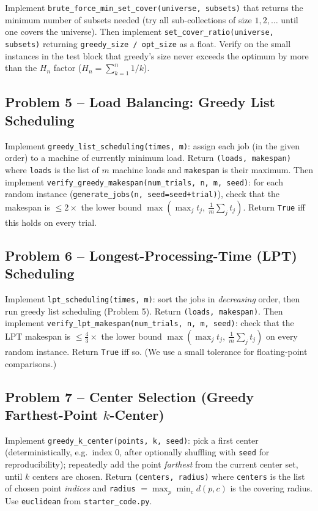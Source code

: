 \documentclass[11pt]{article}
\begin{document}
Implement \texttt{brute\_force\_min\_set\_cover(universe, subsets)} that returns the
minimum number of subsets needed (try all sub-collections of size $1, 2, \ldots$ until one
covers the universe). Then implement \texttt{set\_cover\_ratio(universe, subsets)}
returning \texttt{greedy\_size / opt\_size} as a float. Verify on the small instances in
the test block that greedy's size never exceeds the optimum by more than the $H_n$ factor
($H_n = \sum_{k=1}^{n} 1/k$).

\subsection*{Problem 5 -- Load Balancing: Greedy List Scheduling}

Implement \texttt{greedy\_list\_scheduling(times, m)}: assign each job (in the given order)
to a machine of currently minimum load. Return \texttt{(loads, makespan)} where
\texttt{loads} is the list of $m$ machine loads and \texttt{makespan} is their maximum.
Then implement \texttt{verify\_greedy\_makespan(num\_trials, n, m, seed)}: for each random
instance (\texttt{generate\_jobs(n, seed=seed+trial)}), check that the makespan is
$\le 2\times$ the lower bound $\max(\max_j t_j,\ \frac1m\sum_j t_j)$. Return \texttt{True}
iff this holds on every trial.

\subsection*{Problem 6 -- Longest-Processing-Time (LPT) Scheduling}

Implement \texttt{lpt\_scheduling(times, m)}: sort the jobs in \emph{decreasing} order,
then run greedy list scheduling (Problem 5). Return \texttt{(loads, makespan)}. Then
implement \texttt{verify\_lpt\_makespan(num\_trials, n, m, seed)}: check that the LPT
makespan is $\le \frac43 \times$ the lower bound $\max(\max_j t_j,\ \frac1m\sum_j t_j)$ on
every random instance. Return \texttt{True} iff so. (We use a small tolerance for
floating-point comparisons.)

\subsection*{Problem 7 -- Center Selection (Greedy Farthest-Point $k$-Center)}

Implement \texttt{greedy\_k\_center(points, k, seed)}: pick a first center (deterministically,
e.g.\ index 0, after optionally shuffling with \texttt{seed} for reproducibility);
repeatedly add the point \emph{farthest} from the current center set, until $k$ centers are
chosen. Return \texttt{(centers, radius)} where \texttt{centers} is the list of chosen
point \emph{indices} and \texttt{radius} $= \max_p \min_{c} d(p, c)$ is the covering
radius. Use \texttt{euclidean} from \texttt{starter\_code.py}.
\end{document}
